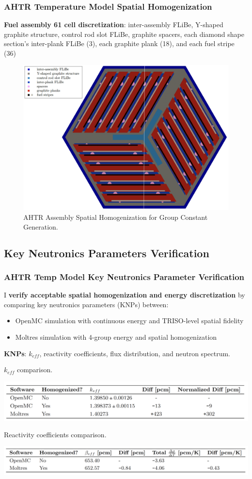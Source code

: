 \begin{frame}
    \frametitle{AHTR Temperature Model Spatial Homogenization}
        \textbf{Fuel assembly 61 cell discretization}: inter-assembly FLiBe, 
        Y-shaped graphite structure, control rod slot FLiBe, graphite spacers, 
        each diamond shape section's inter-plank FLiBe (3), each graphite plank (18), 
        and each fuel stripe (36)
    \begin{figure}[]
            \centering
            \includegraphics[width=0.65\linewidth]{figures/assembly_mg_pres.png}
        \caption{AHTR Assembly Spatial Homogenization for Group Constant Generation.}
    \end{figure}
\end{frame}

\subsection{Key Neutronics Parameters Verification}
\begin{frame}
    \frametitle{AHTR Temp Model Key Neutronics Parameter Verification}
    I \textbf{verify acceptable spatial homogenization and energy discretization} by 
    comparing key neutronics parameters (KNPs) between: 
    \begin{itemize} 
        \item OpenMC simulation with continuous energy and TRISO-level spatial fidelity
        \item Moltres simulation with 4-group energy and spatial homogenization
    \end{itemize}
    \textbf{KNPs}: $k_{eff}$, reactivity coefficients, flux distribution, and neutron spectrum. 
        \begin{table}
            \caption{ $k_{eff}$ comparison.}
            \includegraphics[width=0.85\linewidth]{figures/benchmark-keff.png}
        \end{table}
        \begin{table}
            \caption{Reactivity coefficients comparison.}
            \includegraphics[width=0.85\linewidth]{figures/benchmark-coeff.png}
        \end{table}
\end{frame}

